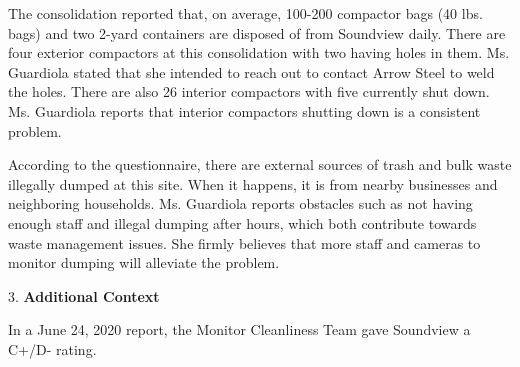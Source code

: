 The consolidation reported that, on average, 100-200 compactor bags (40 lbs. bags) and two 2-yard containers are disposed of from Soundview daily. There are four exterior compactors at this consolidation with two having holes in them. Ms. Guardiola stated that she intended to reach out to contact Arrow Steel to weld the holes. There are also 26 interior compactors with five currently shut down. Ms. Guardiola reports that interior compactors shutting down is a consistent problem.

According to the questionnaire, there are external sources of trash and bulk waste illegally dumped at this site. When it happens, it is from nearby businesses and neighboring households. Ms. Guardiola reports obstacles such as not having enough staff and illegal dumping after hours, which both contribute towards waste management issues. She firmly believes that more staff and cameras to monitor dumping will alleviate the problem.

3. \textbf{Additional Context}

In a June 24, 2020 report, the Monitor Cleanliness Team gave Soundview a C+/D- rating. 